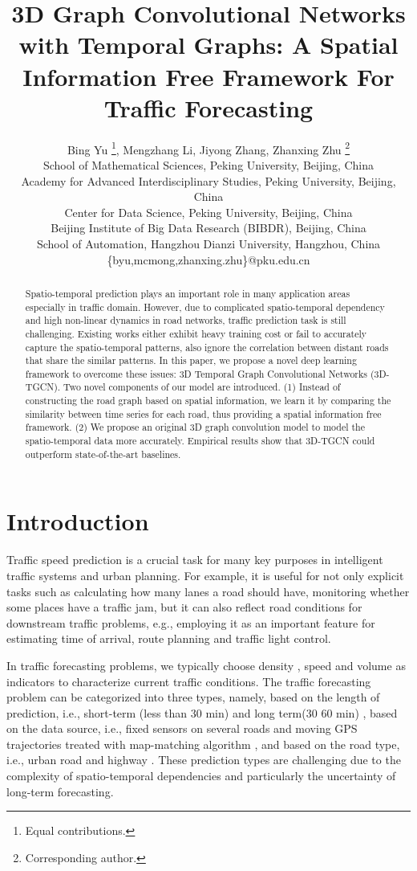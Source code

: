 \documentclass{article}
\title{3D Graph Convolutional Networks with Temporal Graphs: A Spatial Information Free Framework For Traffic Forecasting}
\author{
Bing Yu \thanks{Equal contributions.}, 
 Mengzhang Li, 
 Jiyong Zhang, 
 Zhanxing Zhu \thanks{Corresponding author.}
 \\
 \affiliations
 School of Mathematical Sciences, Peking University, Beijing, China\\
 Academy for Advanced Interdisciplinary Studies, Peking University, Beijing, China\\
 Center for Data Science, Peking University, Beijing, China\\
 Beijing Institute of Big Data Research (BIBDR), Beijing, China\\
 School of Automation, Hangzhou Dianzi University, Hangzhou, China\\
 \emails
 \{byu,mcmong,zhanxing.zhu\}@pku.edu.cn 
 }
\begin{document}
\maketitle
\begin{abstract}
Spatio-temporal prediction plays an important role in many application areas especially in traffic domain. However, due to complicated spatio-temporal dependency and high non-linear dynamics in road networks, traffic prediction task is still  challenging. Existing works either exhibit heavy training cost or fail to accurately capture the spatio-temporal patterns, also ignore the correlation between distant roads that share the similar patterns. In this paper, we propose a novel deep learning framework to overcome these issues: 3D Temporal Graph Convolutional Networks (3D-TGCN). Two novel components of our model are introduced. (1) Instead of constructing the road graph based on spatial information, we learn it by comparing the similarity between time series for each road, thus providing a spatial information free framework. (2) We propose an original 3D graph convolution model to model the spatio-temporal data more accurately. Empirical results show that 3D-TGCN could outperform state-of-the-art baselines. 
\end{abstract}

\section{Introduction}
Traffic speed prediction is a crucial task for many key purposes in intelligent traffic systems and urban planning. For example, it is useful for not only explicit tasks such as calculating how many lanes a road should have, monitoring whether some places have a traffic jam, but it can also reflect road conditions for downstream traffic problems, e.g., employing it as an important feature for estimating time of arrival, route planning and traffic light control.

In traffic forecasting problems, we typically choose density \cite{kriegel2008statistical}, speed \cite{ma2015long} and volume \cite{okutani1984dynamic} as indicators to characterize current traffic conditions. The traffic forecasting problem can be categorized into three types, namely, based on the length of prediction, i.e., short-term (less than 30 min) \cite{vlahogianni2005optimized} and long term(30  60 min) \cite{ostring2001influence}, based on the data source, i.e., fixed sensors on several roads \cite{li2018diffusion} and moving GPS trajectories treated with map-matching algorithm \cite{castro2012urban}, and based on the road type, i.e., urban road \cite{stathopoulos2003multivariate} and highway \cite{fitzpatrick2000speed}. These prediction types are  challenging due to the complexity of spatio-temporal dependencies and particularly the uncertainty of long-term forecasting. 
\end{document}
